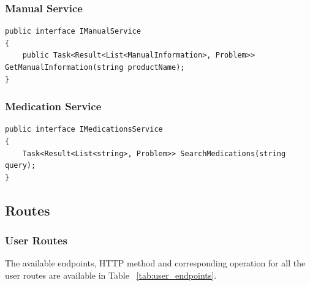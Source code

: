 \subsubsection{Manual Service}

\begin{lstlisting}[style=sharpc]
public interface IManualService
{
	public Task<Result<List<ManualInformation>, Problem>> GetManualInformation(string productName);
}
\end{lstlisting}


\subsubsection{Medication Service}

\begin{lstlisting}[style=sharpc]
public interface IMedicationsService
{
	Task<Result<List<string>, Problem>> SearchMedications(string query);
}
\end{lstlisting}

\newpage

\subsection{Routes}

\subsubsection{User Routes}
The available endpoints, HTTP method and corresponding operation for all the user routes are available in Table ~\ref{tab:user_endpoints}. 

